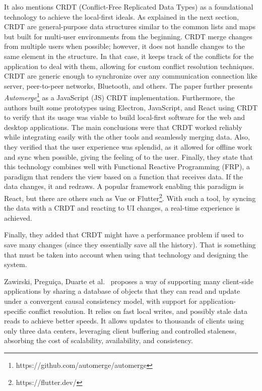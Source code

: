 It also mentions CRDT (Conflict-Free Replicated Data Types) as a foundational technology to achieve the local-first ideals. As explained in the next section,  CRDT are general-purpose data structures similar to the common lists and maps but built for multi-user environments from the beginning. CRDT merge changes from multiple users when possible; however, it does not handle changes to the same element in the structure. In that case, it keeps track of the conflicts for the application to deal with them, allowing for custom conflict resolution techniques. CRDT are generic enough to synchronize over any communication connection like server, peer-to-peer networks, Bluetooth, and others. The paper further presents \textit{Automerge}\footnote{https://github.com/automerge/automerge} as a JavaScript (JS) CRDT implementation. Furthermore, the authors built some prototypes using Electron, JavaScript, and React using CRDT to verify that its usage was viable to build local-first software for the web and desktop applications. The main conclusions were that CRDT worked reliably while integrating easily with the other tools and seamlessly merging data. Also, they verified that the user experience was splendid, as it allowed for offline work and sync when possible, giving the feeling of  to the user. Finally, they state that this technology combines well with Functional Reactive Programming (FRP), a paradigm that renders the view based on a function that receives data. If the data changes, it  and redraws. A popular framework enabling this paradigm is React, but there are others such as Vue or Flutter\footnote{https://flutter.dev/}. With such a tool, by syncing the data with a CRDT and reacting to UI changes, a real-time experience is achieved.

Finally, they added that CRDT might have a performance problem if used to save many changes (since they essentially save all the history). That is something that must be taken into account when using that technology and designing the system.

Zawirski, Preguiça, Duarte et al.\ \cite{Zawirski2015} proposes a way of supporting many client-side applications by sharing a database of objects that they can read and update under a convergent causal consistency model, with support for application-specific conflict resolution. It relies on fast local writes, and possibly stale data reads to achieve better speeds. It allows updates to thousands of clients using only three data centers, leveraging client buffering and controlled staleness, absorbing the cost of scalability, availability, and consistency.

